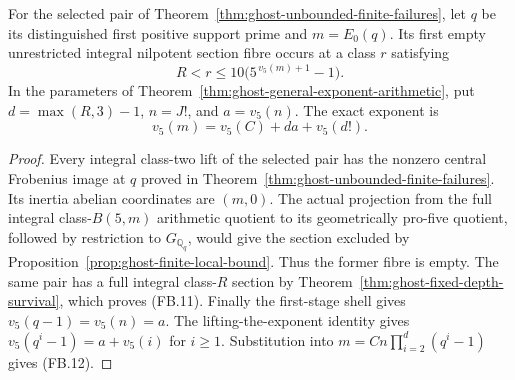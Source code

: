 \begin{corollary}
\label{cor:ghost-selected-failure-bound}
For the selected pair of
Theorem~\ref{thm:ghost-unbounded-finite-failures},
let \(q\) be its distinguished first positive
support prime and \(m=E_0(q)\).
Its first empty unrestricted integral
nilpotent section fibre occurs at a class \(r\)
satisfying
\[
 R<r\le10\bigl(5^{\,v_5(m)+1}-1\bigr).
 \tag{FB.11}
\]
In the parameters of Theorem~\ref{thm:ghost-general-exponent-arithmetic},
put \(d=\max(R,3)-1\), \(n=J!\), and \(a=v_5(n)\).
The exact exponent is
\[
 v_5(m)=v_5(C)+da+v_5(d!).
 \tag{FB.12}
\]
\end{corollary}
\begin{proof}
Every integral class-two lift of the selected
pair has the nonzero central Frobenius image
at \(q\) proved in
Theorem~\ref{thm:ghost-unbounded-finite-failures}.
Its inertia abelian coordinates are \((m,0)\).
The actual projection from the full integral
class-\(B(5,m)\) arithmetic quotient to its
geometrically pro-five quotient, followed by
restriction to \(G_{\mathbb Q_q}\), would give
the section excluded by
Proposition~\ref{prop:ghost-finite-local-bound}.
Thus the former fibre is empty.
The same pair has a full integral class-\(R\)
section by Theorem~\ref{thm:ghost-fixed-depth-survival},
which proves (FB.11).
Finally the first-stage shell gives
\(v_5(q-1)=v_5(n)=a\).
The lifting-the-exponent identity gives
\(v_5(q^i-1)=a+v_5(i)\) for \(i\ge1\).
Substitution into
\(m=Cn\prod_{i=2}^d(q^i-1)\)
gives (FB.12).
\end{proof}
